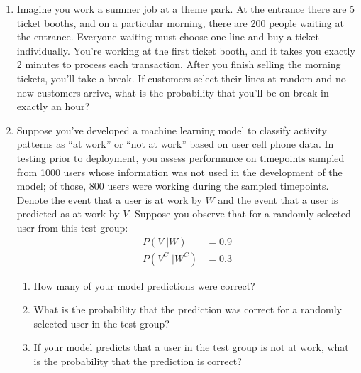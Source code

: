 \documentclass[
  letterpaper,
  DIV=11,
  numbers=noendperiod]{scrartcl}
\providecommand{\tightlist}{%
  \setlength{\itemsep}{0pt}\setlength{\parskip}{0pt}}\usepackage{longtable,booktabs,array}
\begin{document}
\begin{enumerate}
\def\labelenumi{\arabic{enumi}.}
\setcounter{enumi}{1}
\item
  Imagine you work a summer job at a theme park. At the entrance there
  are 5 ticket booths, and on a particular morning, there are 200 people
  waiting at the entrance. Everyone waiting must choose one line and buy
  a ticket individually. You're working at the first ticket booth, and
  it takes you exactly 2 minutes to process each transaction. After you
  finish selling the morning tickets, you'll take a break. If customers
  select their lines at random and no new customers arrive, what is the
  probability that you'll be on break in exactly an hour?
\item
  Suppose you've developed a machine learning model to classify activity
  patterns as ``at work'' or ``not at work'' based on user cell phone
  data. In testing prior to deployment, you assess performance on
  timepoints sampled from 1000 users whose information was not used in
  the development of the model; of those, 800 users were working during
  the sampled timepoints. Denote the event that a user is at work by
  \(W\) and the event that a user is predicted as at work by \(V\).
  Suppose you observe that for a randomly selected user from this test
  group: \[
  \begin{align*}
  P(V\;|W) &= 0.9 \\
  P\left(V^C\;|W^C\right) &= 0.3
  \end{align*}
  \]

  \begin{enumerate}
  \def\labelenumii{\roman{enumii}.}
  \tightlist
  \item
    How many of your model predictions were correct?
  \item
    What is the probability that the prediction was correct for a
    randomly selected user in the test group?
  \item
    If your model predicts that a user in the test group is not at work,
    what is the probability that the prediction is correct?
  \end{enumerate}
\end{enumerate}
\end{document}
